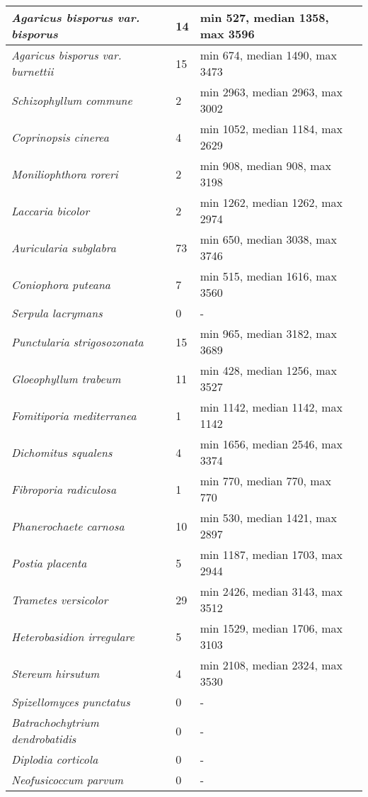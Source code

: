 {\begin{longtable}{| L{4cm} | L{2cm}  | L{5cm} | L{4cm} |}
\textit{Agaricus bisporus var. bisporus} & 14 & min 527, median 1358, max 3596 & \\ \hline
\textit{Agaricus bisporus var. burnettii} & 15 & min 674, median 1490, max 3473 & \\ \hline
\textit{Schizophyllum commune} & 2 & min 2963, median 2963, max 3002 & \\ \hline
\textit{Coprinopsis cinerea} & 4 & min 1052, median 1184, max 2629 & \\ \hline
\textit{Moniliophthora roreri} & 2 & min 908, median 908, max 3198 & \\ \hline
\textit{Laccaria bicolor} & 2 & min 1262, median 1262, max 2974 & \\ \hline
\textit{Auricularia subglabra} & 73 & min 650, median 3038, max 3746 & \\ \hline
\textit{Coniophora puteana} & 7 & min 515, median 1616, max 3560 & \\ \hline
\textit{Serpula lacrymans} & 0 & - & \\ \hline
\textit{Punctularia strigosozonata} & 15 & min 965, median 3182, max 3689 & \\ \hline
\textit{Gloeophyllum trabeum} & 11 & min 428, median 1256, max 3527 & \\ \hline
\textit{Fomitiporia mediterranea} & 1 & min 1142, median 1142, max 1142 & \\ \hline
\textit{Dichomitus squalens} & 4 & min 1656, median 2546, max 3374 & \\ \hline
\textit{Fibroporia radiculosa} & 1 & min 770, median 770, max 770 & \\ \hline
\textit{Phanerochaete carnosa} & 10 & min 530, median 1421, max 2897 & \\ \hline
\textit{Postia placenta} & 5 & min 1187, median 1703, max 2944 & \\ \hline
\textit{Trametes versicolor} & 29 & min 2426, median 3143, max 3512 & \\ \hline
\textit{Heterobasidion irregulare} & 5 & min 1529, median 1706, max 3103 & \\ \hline
\textit{Stereum hirsutum} & 4 & min 2108, median 2324, max 3530 & \\ \hline
\textit{Spizellomyces punctatus} & 0 & - & \\ \hline
\textit{Batrachochytrium dendrobatidis} & 0 & - & \\ \hline
\textit{Diplodia corticola} & 0 & - & \\ \hline
\textit{Neofusicoccum parvum} & 0 & - & \\ \hline

\end{longtable}}
